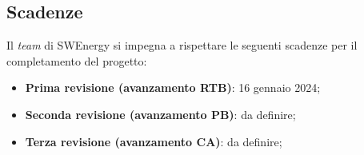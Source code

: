 \subsection{Scadenze}
Il \textit{team} di SWEnergy si impegna a rispettare le seguenti scadenze per il
completamento del progetto:
\begin{itemize}
	\item \textbf{Prima revisione (avanzamento RTB)}: 16 gennaio 2024;
	\item \textbf{Seconda revisione (avanzamento PB)}: da definire;
	\item \textbf{Terza revisione (avanzamento CA)}: da definire;
\end{itemize}
